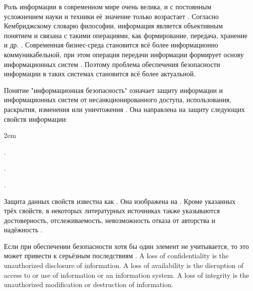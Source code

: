 %
Роль информации в современном мире очень велика, и с постоянным усложнением науки и техники её 
значение только возрастает .
%
Согласно Кембриджскому словарю философии, информация является объективным понятием и связана с 
такими операциями, как формирование, передача, хранение и др. .
%
Современная бизнес-среда становится всё более информационно коммуникабельной, при этом операция 
передачи информации формирует основу информационных систем . 
%
Поэтому проблема обеспечения безопасности информации в таких системах становится всё более 
актуальной.

%
Понятие "информационная безопасность" означает защиту информации и информационных систем от 
несанкционированного доступа, использования, раскрытия, изменения или уничтожения 
. 
%
Она направлена на защиту следующих свойств информации:
\begin{description}
	\leftskip2em%
	\setlength{\itemsep}{0pt}%
	\setlength{\parsep}{0pt}%

	\item[Целостность] .
	\item[Конфиденциальность] .
	\item[Доступность] .
\end{description}

%
Защита данных свойств известна как \Emphasis{\CIATriad}.
%
Она изображена на . 
%
Кроме указанных трёх свойств, в некоторых литературных источниках также указываются достоверность, 
отслеживаемость, невозможность отказа от авторства и надёжность . 


%
Если при обеспечении безопасности хотя бы один элемент \CIATriad не учитывается, то это может 
привести к серьёзным последствиям .
%
A loss of confidentiality is the unauthorized disclosure of information.
%
A loss of availability is the disruption of access to or use of information or an information 
system.
%
A loss of integrity is the unauthorized modification or destruction of information.

